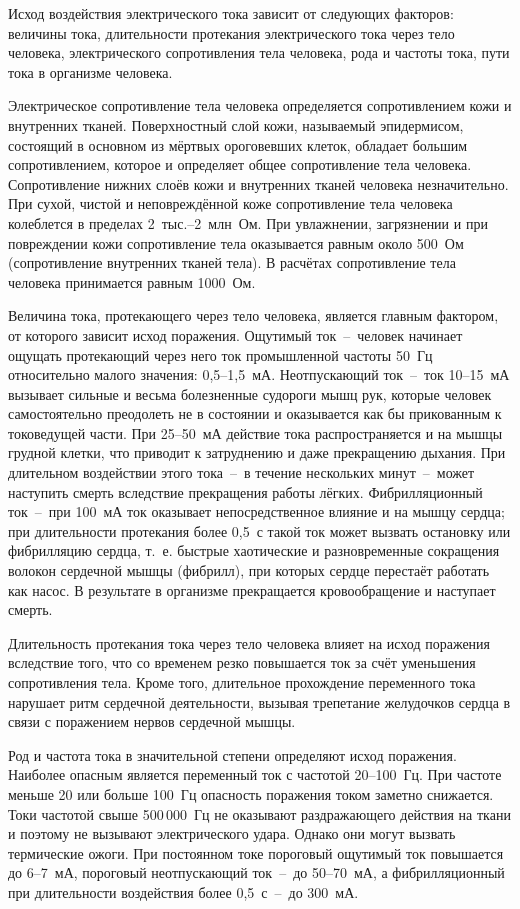 Исход воздействия электрического тока зависит от следующих факторов: величины тока, длительности протекания электрического тока через тело человека, электрического сопротивления тела человека, рода и частоты тока, пути тока в организме человека.

Электрическое сопротивление тела человека определяется сопротивлением кожи и внутренних тканей.
Поверхностный слой кожи, называемый эпидермисом, состоящий в основном из мёртвых ороговевших клеток, обладает большим сопротивлением, которое и определяет общее сопротивление тела человека.
Сопротивление нижних слоёв кожи и внутренних тканей человека незначительно.
При сухой, чистой и неповреждённой коже сопротивление тела человека колеблется в пределах 2~тыс.--2~млн~Ом.
При увлажнении, загрязнении и при повреждении кожи сопротивление тела оказывается равным около 500~Ом (сопротивление внутренних тканей тела).
В расчётах сопротивление тела человека принимается равным 1000~Ом.

Величина тока, протекающего через тело человека, является главным фактором, от которого зависит исход поражения.
Ощутимый ток~--~человек начинает ощущать протекающий через него ток промышленной частоты 50~Гц относительно малого значения: 0{,}5--1{,}5~мА.
Неотпускающий ток~--~ток 10--15~мА вызывает сильные и весьма болезненные судороги мышц рук, которые человек самостоятельно преодолеть не в состоянии и оказывается как бы прикованным к токоведущей части.
При 25--50~мА действие тока распространяется и на мышцы грудной клетки, что приводит к затруднению и даже прекращению дыхания.
При длительном воздействии этого тока~--~в течение нескольких минут~--~может наступить смерть вследствие прекращения работы лёгких.
Фибрилляционный ток~--~при 100~мА ток оказывает непосредственное влияние и на мышцу сердца; при длительности протекания более 0{,}5~с такой ток может вызвать остановку или фибрилляцию сердца, т.~е. быстрые хаотические и разновременные сокращения волокон сердечной мышцы (фибрилл), при которых сердце перестаёт работать как насос.
В результате в организме прекращается кровообращение и наступает смерть.

Длительность протекания тока через тело человека влияет на исход поражения вследствие того, что со временем резко повышается ток за счёт уменьшения сопротивления тела.
Кроме того, длительное прохождение переменного тока нарушает ритм сердечной деятельности, вызывая трепетание желудочков сердца в связи с поражением нервов сердечной мышцы.

Род и частота тока в значительной степени определяют исход поражения.
Наиболее опасным является переменный ток с частотой 20--100~Гц.
При частоте меньше 20 или больше 100~Гц опасность поражения током заметно снижается.
Токи частотой свыше 500\,000~Гц не оказывают раздражающего действия на ткани и поэтому не вызывают электрического удара.
Однако они могут вызвать термические ожоги.
При постоянном токе пороговый ощутимый ток повышается до 6--7~мА, пороговый неотпускающий ток~--~до 50--70~мА, а фибрилляционный при длительности воздействия более 0{,}5~с~--~до 300~мА.

